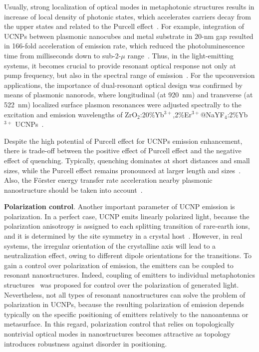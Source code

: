 \documentclass[journal=chreay,manuscript=review]{achemso}
\begin{document}
Usually, strong localization of optical modes in metaphotonic structures results in increase of local density of photonic states, which accelerates carriers decay from the upper states and related to the Purcell effect~\cite{purcell1995spontaneous, akselrod2014probing}. For example, integration of UCNPs between plasmonic nanocubes and metal substrate in 20-nm gap resulted in 166-fold acceleration of emission rate, which reduced the photoluminescence time from milliseconds down to sub-2-$\mu$ range~\cite{wu2019upconversion}.
Thus, in the light-emitting systems, it becomes crucial to provide resonant optical response not only at pump frequency, but also in the spectral range of emission~\cite{park2015plasmon}. For the upconversion applications, the importance of dual-resonant optical design was confirmed by means of plasmonic nanorods, where longitudinal (at 920~nm) and transverse (at 522~nm) localized surface plasmon resonances were adjusted spectrally to the excitation and emission wavelengths of ZrO$_2$:20\%Yb$^{3+}$,2\%Er$^{3+}$@NaYF$_4$:2\%Yb$^{3+}$ UCNPs~\cite{zhan2015tens}. 

Despite the high potential of Purcell effect for UCNPs emission enhancement, there is trade-off between the positive effect of Purcell effect and the negative effect of quenching. Typically, quenching dominates at short distances and small sizes, while the Purcell effect remains pronounced at larger length and sizes~\cite{mendez2019control}. Also, the F{\"o}rster energy transfer rate acceleration nearby plasmonic nanostructure should be taken into account~\cite{sun2014plasmon, lu2014plasmon}.

{\bf Polarization control}. Another important parameter of UCNP emission is polarization. In a perfect case, UCNP emits linearly polarized light, because the polarization
anisotropy is assigned to each splitting transition of rare-earth ions, and it is determined by the site symmetry in a crystal host~\cite{zhou2013ultrasensitive, rodriguez2016determining}. However, in real systems, the irregular orientation of the crystalline axis will lead to a neutralization effect, owing to different dipole orientations for the transitions. 
To gain a control over polarization of emission, the emitters can be coupled to resonant nanostructures. Indeed, coupling of emitters to individual metaphotonics structures~\cite{curto2010unidirectional, novotny2011antennas, cotrufo2016spin}  was proposed for control over the polarization of generated light. Nevertheless, not all types of resonant nanostructures can solve the problem of polarization in UCNPs, because the resulting polarization of emission depends typically on
the specific positioning of emitters relatively to the nanoantenna or metasurface. In this regard, polarization control that relies on topologically nontrivial optical modes in nanostructures becomes attractive as topology introduces
robustness against disorder in positioning. 
\end{document}
